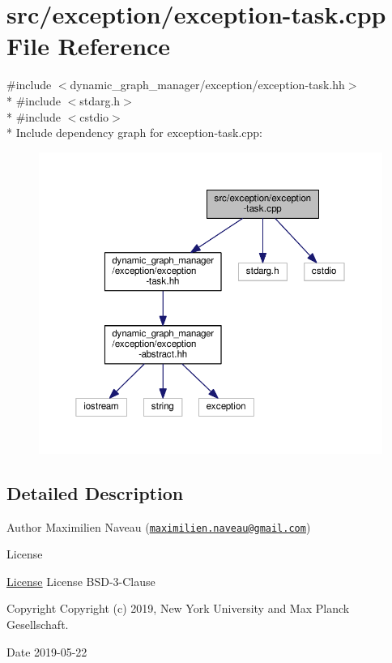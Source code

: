 \hypertarget{exception-task_8cpp}{}\section{src/exception/exception-\/task.cpp File Reference}
\label{exception-task_8cpp}
{\ttfamily \#include $<$dynamic\+\_\+graph\+\_\+manager/exception/exception-\/task.\+hh$>$}\\*
{\ttfamily \#include $<$stdarg.\+h$>$}\\*
{\ttfamily \#include $<$cstdio$>$}\\*
Include dependency graph for exception-\/task.cpp\+:
\nopagebreak
\begin{figure}[H]
\begin{center}
\leavevmode
\includegraphics[width=350pt]{exception-task_8cpp__incl}
\end{center}
\end{figure}


\subsection{Detailed Description}
\begin{DoxyAuthor}{Author}
Maximilien Naveau (\href{mailto:maximilien.naveau@gmail.com}{\tt maximilien.\+naveau@gmail.\+com}) 
\end{DoxyAuthor}
\begin{DoxyRefDesc}{License}
\item[\hyperlink{license__license000051}{License}]License B\+S\+D-\/3-\/\+Clause \end{DoxyRefDesc}
\begin{DoxyCopyright}{Copyright}
Copyright (c) 2019, New York University and Max Planck Gesellschaft. 
\end{DoxyCopyright}
\begin{DoxyDate}{Date}
2019-\/05-\/22 
\end{DoxyDate}
